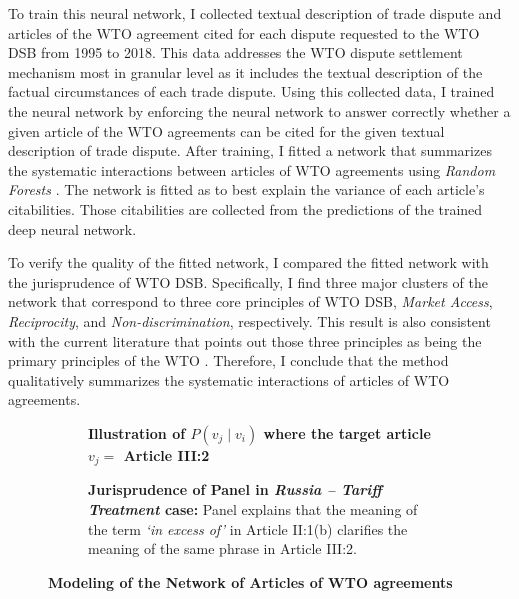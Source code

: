 To train this neural network, I collected textual description of trade dispute and articles of the WTO agreement cited for each dispute requested to the WTO DSB
from 1995 to 2018. This data addresses the WTO dispute settlement mechanism most in granular level as it includes the textual description of the factual circumstances of each trade dispute.
Using this collected data, I trained the neural network by enforcing the neural network to answer correctly
whether a given article of the WTO agreements
can be cited for the given textual description of
trade dispute. After training, I fitted a network that summarizes the systematic interactions between articles of WTO agreements using \textit{Random Forests} \citep{rf, genie3}.
The network is fitted as to best explain the variance of each article's citabilities. Those citabilities are collected from the predictions of the trained deep neural network.

To verify the quality of the fitted network, I compared the fitted network with the jurisprudence of WTO DSB.
Specifically, I find three major clusters of the network that correspond to three core principles of WTO DSB, \textit{Market Access}, \textit{Reciprocity}, and \textit{Non-discrimination}, respectively.
This result is also consistent with the current literature that points out those three principles as being the primary principles of the WTO \citep{bagwell1999}.
Therefore, I conclude that the method qualitatively summarizes the systematic interactions of articles of WTO agreements.


\begin{figure}[t!]
 \captionsetup[subfigure]{justification=centering}
 \begin{subfigure}[b]{1\textwidth}
     \centering{
         
     }
     \caption{\textbf{Illustration of $P(v_j \mid v_i)$ where the target article $v_j=$ Article III:2}}
     \label{subfig:a:art2b}
 \end{subfigure}
 \vfill
 \begin{subfigure}[b]{1\textwidth}
     \centering{
         
     }
     \centering
     \caption{\textbf{Jurisprudence of Panel in \textit{Russia – Tariff Treatment} case:} Panel explains that the meaning of the term \textit{`in excess of'} in Article II:1(b) clarifies the meaning of the same phrase in Article III:2.}
     \label{subfig:a:condprob}
 \end{subfigure}
 \caption{\textbf{Modeling of the Network of Articles of WTO agreements}}
 \label{fig:def-example}
\end{figure}
 
